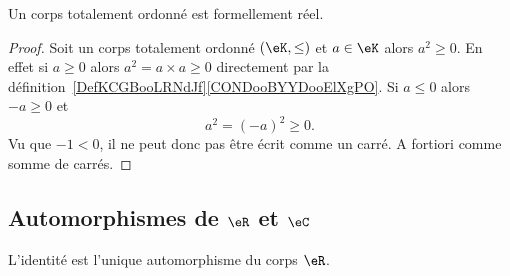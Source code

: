 \begin{proposition}
    Un corps totalement ordonné est formellement réel.
\end{proposition}

\begin{proof}
    Soit un corps totalement ordonné \( (\eK,\leq)\) et \( a\in \eK\) alors \( a^2\geq 0\). En effet si \( a\geq 0\) alors \( a^2=a\times a\geq 0\) directement par la définition~\ref{DefKCGBooLRNdJf}\ref{CONDooBYYDooElXgPO}. Si \( a\leq 0\) alors \( -a\geq 0\) et
    \begin{equation}
        a^2=(-a)^2\geq 0.
    \end{equation}
    Vu que \( -1<0\), il ne peut donc pas être écrit comme un carré. A fortiori comme somme de carrés.
\end{proof}

\subsection{Automorphismes de \texorpdfstring{$ \eR$}{R} et \texorpdfstring{$ \eC$}{C}}

\begin{proposition}     \label{PROPooLLPMooIVanaO}
    L'identité est l'unique automorphisme du corps \( \eR\).
\end{proposition}

